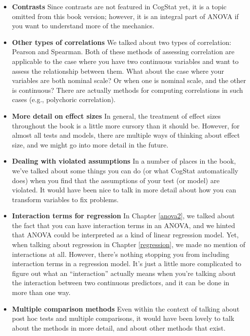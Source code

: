 \documentclass[
  11pt,
  a4paper,
  twoside,symmetric,openright]{book}
\providecommand{\tightlist}{%
  \setlength{\itemsep}{0pt}\setlength{\parskip}{0pt}}
\theoremstyle{break}
\theoremstyle{break}
\begin{document}
\begin{itemize}
\tightlist
\item
  \textbf{Contrasts} Since contrasts are not featured in CogStat yet, it is a topic omitted from this book version; however, it is an integral part of ANOVA if you want to understand more of the mechanics.
\item
  \textbf{Other types of correlations} We talked about two types of correlation: Pearson and Spearman. Both of these methods of assessing correlation are applicable to the case where you have two continuous variables and want to assess the relationship between them. What about the case where your variables are both nominal scale? Or when one is nominal scale, and the other is continuous? There are actually methods for computing correlations in such cases (e.g., polychoric correlation).
\item
  \textbf{More detail on effect sizes} In general, the treatment of effect sizes throughout the book is a little more cursory than it should be. However, for almost all tests and models, there are multiple ways of thinking about effect size, and we might go into more detail in the future.
\item
  \textbf{Dealing with violated assumptions} In a number of places in the book, we've talked about some things you can do (or what CogStat automatically does) when you find that the assumptions of your test (or model) are violated. It would have been nice to talk in more detail about how you can transform variables to fix problems.
\item
  \textbf{Interaction terms for regression} In Chapter \ref{anova2}, we talked about the fact that you can have interaction terms in an ANOVA, and we hinted that ANOVA could be interpreted as a kind of linear regression model. Yet, when talking about regression in Chapter \ref{regression}, we made no mention of interactions at all. However, there's nothing stopping you from including interaction terms in a regression model. It's just a little more complicated to figure out what an ``interaction'' actually means when you're talking about the interaction between two continuous predictors, and it can be done in more than one way.
\item
  \textbf{Multiple comparison methods} Even within the context of talking about post hoc tests and multiple comparisons, it would have been lovely to talk about the methods in more detail, and about other methods that exist.
\end{itemize}
\end{document}
